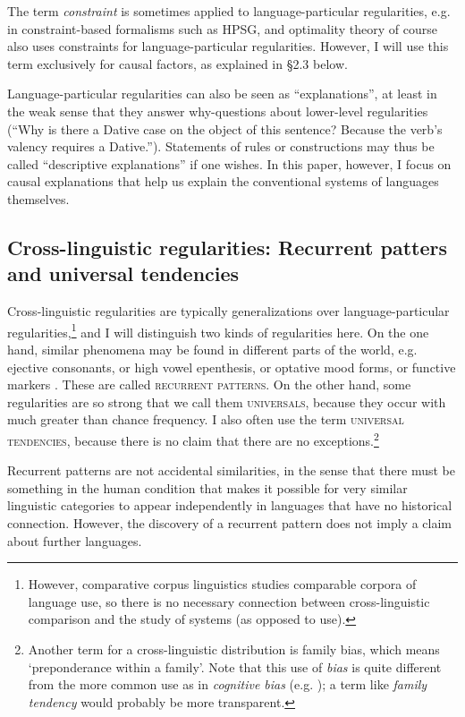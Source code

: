 \documentclass[output=paper]{langsci/langscibook}
\begin{document}
The term \textit{constraint} is sometimes applied to language-particular regularities, e.g. in constraint-based formalisms such as HPSG, and optimality theory of course also uses constraints for language-particular regularities. However, I will use this term exclusively for causal factors, as explained in §2.3 below.

Language-particular regularities can also be seen as “explanations”, at least in the weak sense that they answer why-questions about lower-level regularities (“Why is there a Dative case on the object of this sentence? Because the verb’s valency requires a Dative.”). Statements of rules or constructions may thus be called “descriptive explanations” if one wishes. In this paper, however, I focus on causal explanations that help us explain the conventional systems of languages themselves.

\subsection{Cross-linguistic regularities: Recurrent patters and universal tendencies}\label{sec:haspelmath:2.2}


Cross-linguistic regularities are typically generalizations over language-particular regularities,\footnote{However, comparative corpus linguistics studies comparable corpora of language use, so there is no necessary connection between cross-linguistic comparison and the study of systems (as opposed to use).} and I will distinguish two kinds of regularities here. On the one hand, similar phenomena may be found in different parts of the world, e.g. ejective consonants, or high vowel epenthesis, or optative mood forms, or functive markers \citep{Creissels2014}. These are called \textsc{recurrent patterns}. On the other hand, some regularities are so strong that we call them \textsc{universals}, because they occur with much greater than chance frequency. I also often use the term \textsc{universal tendencies}, because there is no claim that there are no exceptions.\footnote{Another term for a cross-linguistic distribution is  family bias, which means ‘preponderance within a family’. Note that this use of \textit{bias} is quite different from the more common use as in \textit{cognitive bias} (e.g. \citealt{TverskyKahneman1974}); a term like \textit{family tendency} would probably be more transparent.}

Recurrent patterns are not accidental similarities, in the sense that there must be something in the human condition that makes it possible for very similar linguistic categories to appear independently in languages that have no historical connection. However, the discovery of a recurrent pattern does not imply a claim about further languages.
\end{document}
